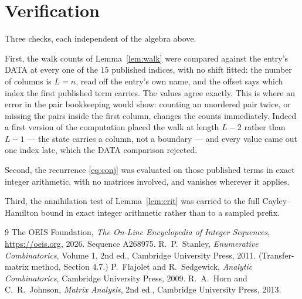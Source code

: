 \documentclass[11pt,a4paper]{article}
\theoremstyle{plain}
\theoremstyle{definition}
\begin{document}
\section{Verification}

Three checks, each independent of the algebra above.

First, the walk counts of Lemma~\ref{lem:walk} were compared against the entry's DATA at
every one of the $15$ published indices, with no shift fitted: the number of columns is
$L=n$, read off the entry's own name, and the offset says which index the first
published term carries. The values agree exactly. This is where an error in the pair
bookkeeping would show: counting an unordered pair twice, or missing the pairs inside the
first column, changes the counts immediately. Indeed a first version of the computation
placed the walk at length $L-2$ rather than $L-1$ --- the state carries a column, not a
boundary --- and every value came out one index late, which the DATA comparison rejected.

Second, the recurrence \eqref{eq:conj} was evaluated on those published terms in exact
integer arithmetic, with no matrices involved, and vanishes wherever it applies.

Third, the annihilation test of Lemma~\ref{lem:crit} was carried to the full
Cayley--Hamilton bound in exact integer arithmetic rather than to a sampled prefix.

\begin{thebibliography}{9}
 The OEIS Foundation, \emph{The On-Line Encyclopedia of Integer
Sequences}, \url{https://oeis.org}, 2026. Sequence A268975.
 R.~P.~Stanley, \emph{Enumerative Combinatorics}, Volume 1, 2nd ed.,
Cambridge University Press, 2011. (Transfer-matrix method, Section 4.7.)
 P.~Flajolet and R.~Sedgewick, \emph{Analytic Combinatorics}, Cambridge
University Press, 2009.
 R.~A.~Horn and C.~R.~Johnson, \emph{Matrix Analysis}, 2nd ed., Cambridge
University Press, 2013.
\end{thebibliography}
\end{document}
